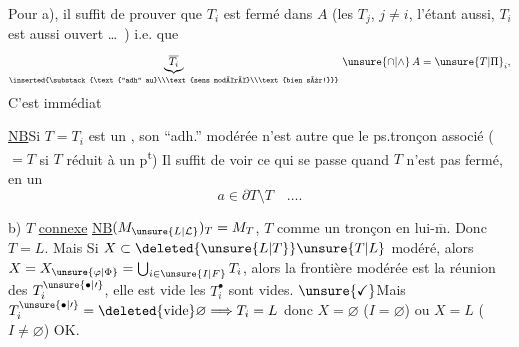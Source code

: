 Pour a), il suffit de prouver que $T_i$ est fermé dans  $A$ (les $T_j$, $j\ne i$, l'étant aussi, $T_i$ est aussi ouvert \ldots\ )   i.e. que
\[
\underbrace{\overline{T_i}}_{\inserted{\substack{\text{``adh'' au}\\\text{sens modéré}\\\text{bien sûr!}}}}\,\unsure{\cap|\wedge}\, A=\unsure{T|\Pi}_{i},
\]
C'est immédiat

\uline{NB}\qquad Si $T=T_i$ est un , son ``adh.'' modérée n'est autre que le ps.tronçon  associé ($=T$ si $T$ réduit à un p\textsuperscript{t}) Il suffit de voir ce qui se passe quand $T$ n'est pas fermé, en un   
\[
a\in\partial T\setminus T\quad\ldots.
\]

b) $T$ \uline{connexe}\quad {} \uline{NB}\quad $(M_{\unsure{L|\mathcal L}})_T=M_T$,
 $T$ comme un tronçon en lui-$\overline{\text{m}}$.  Donc  $T=L$. Mais Si $X\subset\deleted{\unsure{L|T}}\unsure{T|L}$ modéré,
alors \unsure{:}  $X=X_{\unsure{\varphi|\Phi}}=\bigcup_{i\in\unsure{I|F}}T_i$, alors  la frontière modérée est la réunion des \deleted{$\unsure{\partial}$} $T_i^{\unsure{\bullet|\prime}}$,
elle est vide  les $T_i^\bullet$ sont vides. $\unsure{\checkmark}$Mais $T_i^{\unsure{\bullet|\prime}}=\deleted{\text{vide}}\varnothing\Longrightarrow T_i=L$ donc $X=\varnothing$ ($I=\varnothing$) ou $X=L$ ($I\ne\varnothing$) OK.

